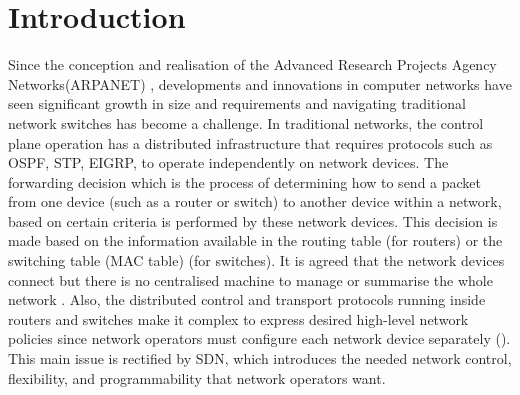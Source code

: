 \documentclass{article}
\begin{document}
\section{Introduction}
Since the conception and realisation of the Advanced Research Projects Agency Networks(ARPANET) \citep{5432117}, developments and innovations in computer networks have seen significant growth in size and requirements and navigating traditional network switches has become a challenge. In traditional networks, the control plane operation has a distributed infrastructure that requires protocols such as OSPF, STP, EIGRP, to operate independently on network devices. The forwarding decision which is the process of determining how to send a packet from one device (such as a router or switch) to another device within a network, based on certain criteria is performed by these network devices. This decision is made based on the information available in the routing table (for routers) or the switching table (MAC table) (for switches). It is agreed that the network devices connect but there is no centralised machine to manage or summarise the whole network \citep{Haji_Zeebaree_Saeed_Ameen_Shukur_Omar_Sadeeq_Ageed_Ibrahim_Yasin_2021}. Also, the distributed control and transport protocols running inside routers and switches make it complex to express desired high-level network policies since network operators must configure each network device separately (\cite{6994333}). This main issue is rectified by SDN, which introduces the needed network control, flexibility, and programmability that network operators want.\\
\end{document}
